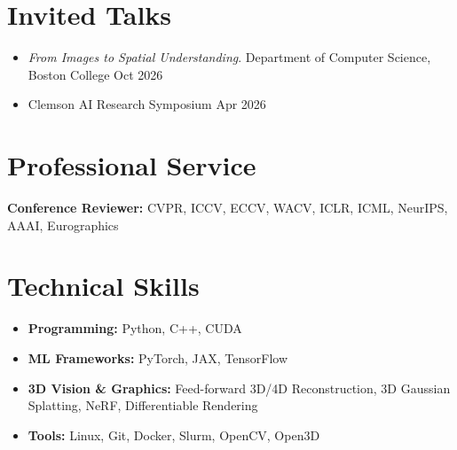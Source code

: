 \documentclass[letterpaper,10pt]{article}
\newcommand{\when}[1]{{\color{muted}#1}}
\newcommand{\dated}[2]{\item #1 \hfill \when{#2}}
\begin{document}
\section{Invited Talks}
\begin{itemize}
\dated{\textit{From Images to Spatial Understanding}. Department of Computer Science, Boston College}{Oct 2026}
\dated{Clemson AI Research Symposium}{Apr 2026}
\end{itemize}

\section{Professional Service}
\textbf{Conference Reviewer:}
CVPR, ICCV, ECCV, WACV, ICLR, ICML, NeurIPS, AAAI, Eurographics

\section{Technical Skills}
\begin{itemize}[label={}, leftmargin=0pt]
  \item \textbf{Programming:} Python, C++, CUDA
  \item \textbf{ML Frameworks:} PyTorch, JAX, TensorFlow
  \item \textbf{3D Vision \& Graphics:} Feed-forward 3D/4D Reconstruction, 3D Gaussian Splatting, NeRF, Differentiable Rendering
  \item \textbf{Tools:} Linux, Git, Docker, Slurm, OpenCV, Open3D
\end{itemize}
\end{document}
